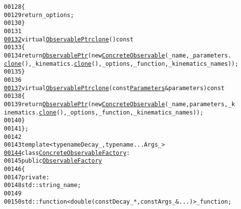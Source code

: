 \begin{footnotesize}
\begin{alltt}
00128             \{
00129                 \textcolor{keywordflow}{return} \_options;
00130             \}
00131 
\hypertarget{concrete__observable_8hh_source_l00132}{}\hyperlink{classeos_1_1ConcreteObservable_af84f6c7410ff512dc8edb36f4501e389}{00132}             \textcolor{keyword}{virtual} \hyperlink{namespaceeos_a470e5dd806bd129080f1aa0c2954646f}{ObservablePtr} \hyperlink{classeos_1_1ConcreteObservable_af84f6c7410ff512dc8edb36f4501e389}{clone}()\textcolor{keyword}{ const}
00133 \textcolor{keyword}{            }\{
00134                 \textcolor{keywordflow}{return} \hyperlink{namespaceeos_a470e5dd806bd129080f1aa0c2954646f}{ObservablePtr}(\textcolor{keyword}{new} \hyperlink{classeos_1_1ConcreteObservable_a194b98ae4633deff5c8d52d743efe6c3}{ConcreteObservable}(\_name, \_parameters.
      \hyperlink{classeos_1_1Parameters_a273f5bad065bc47b62981734a2e3576e}{clone}(), \_kinematics.\hyperlink{classeos_1_1Kinematics_aedd9681136ab3735fb754e2840e10715}{clone}(), \_options, \_function, \_kinematics\_names));
00135             \}
00136 
\hypertarget{concrete__observable_8hh_source_l00137}{}\hyperlink{classeos_1_1ConcreteObservable_afe63f75a6814eda8dca5d1e842f71fc6}{00137}             \textcolor{keyword}{virtual} \hyperlink{namespaceeos_a470e5dd806bd129080f1aa0c2954646f}{ObservablePtr} \hyperlink{classeos_1_1ConcreteObservable_af84f6c7410ff512dc8edb36f4501e389}{clone}(\textcolor{keyword}{const} \hyperlink{classeos_1_1Parameters}{Parameters} & parameters)\textcolor{keyword}{ const}
00138 \textcolor{keyword}{            }\{
00139                 \textcolor{keywordflow}{return} \hyperlink{namespaceeos_a470e5dd806bd129080f1aa0c2954646f}{ObservablePtr}(\textcolor{keyword}{new} \hyperlink{classeos_1_1ConcreteObservable_a194b98ae4633deff5c8d52d743efe6c3}{ConcreteObservable}(\_name, parameters, \_k
      inematics.\hyperlink{classeos_1_1Kinematics_aedd9681136ab3735fb754e2840e10715}{clone}(), \_options, \_function, \_kinematics\_names));
00140             \}
00141     \};
00142 
00143     \textcolor{keyword}{template} <\textcolor{keyword}{typename} Decay\_, \textcolor{keyword}{typename} ... Args\_>
\hypertarget{concrete__observable_8hh_source_l00144}{}\hyperlink{classeos_1_1ConcreteObservableFactory}{00144}     \textcolor{keyword}{class }\hyperlink{classeos_1_1ConcreteObservableFactory}{ConcreteObservableFactory} :
00145         \textcolor{keyword}{public} \hyperlink{classeos_1_1ObservableFactory}{ObservableFactory}
00146     \{
00147         \textcolor{keyword}{private}:
00148             std::string \_name;
00149 
00150             std::function<double (\textcolor{keyword}{const} Decay\_ *, \textcolor{keyword}{const} Args\_ & ...)> \_function;

\end{alltt}
\end{footnotesize}
